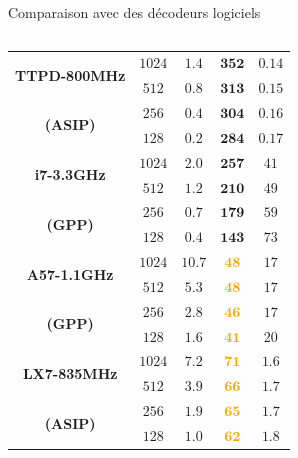 \documentclass[t,compress,mathserif,12pt,xcolor=dvipsnames]{beamer}
\newcommand{\ORANGE} [1]{\textcolor{orange}{\textbf{#1}}}
\newcommand{\GREEN} [1]{\textcolor{dgreen}{\textbf{#1}}}
\begin{document}
\begin{frame}[c]{Comparaison avec des décodeurs logiciels}
\begin{columns}[T]
\begin{column}{.48\textwidth}
{\begin{table}
{{\begin{tabular}{c|c|c|c|c}
				\multirow{2}{*}{\bf TTPD-800MHz}            & $1024$   & $1.4$  & \GREEN{$\mathbf{352}$} & $0.14$ \\ %
				                                            & $512$    & $0.8$  & \GREEN{$\mathbf{313}$} & $0.15$ \\ %
				\multirow{2}{*}{\bf (ASIP)}                 & $256$    & $0.4$  & \GREEN{$\mathbf{304}$} & $0.16$ \\ %
				                                            & $128$    & $0.2$  & \GREEN{$\mathbf{284}$} & $0.17$ \\ %
				\midrule
				\multirow{2}{*}{\bf i7-3.3GHz}              & $1024$   & $2.0$  & \GREEN{$\mathbf{257}$} & $41$   \\
				                                            & $512$    & $1.2$  & \GREEN{$\mathbf{210}$} & $49$   \\
				\multirow{2}{*}{\bf (GPP)}                  & $256$    & $0.7$  & \GREEN{$\mathbf{179}$} & $59$   \\
				                                            & $128$    & $0.4$  & \GREEN{$\mathbf{143}$} & $73$   \\
				\midrule    
				\multirow{2}{*}{\bf A57-1.1GHz}             & $1024$   & $10.7$ & \ORANGE{$\mathbf{48}$} & $17$   \\
				                                            & $512$    & $5.3$  & \ORANGE{$\mathbf{48}$} & $17$   \\
				\multirow{2}{*}{\bf (GPP)}                  & $256$    & $2.8$  & \ORANGE{$\mathbf{46}$} & $17$   \\
				                                            & $128$    & $1.6$  & \ORANGE{$\mathbf{41}$} & $20$   \\
				\midrule
				\multirow{2}{*}{\bf LX7-835MHz}             & $1024$   & $7.2$  & \ORANGE{$\mathbf{71}$} & $1.6$  \\
				                                            & $512$    & $3.9$  & \ORANGE{$\mathbf{66}$} & $1.7$  \\
				\multirow{2}{*}{\bf (ASIP)}                 & $256$    & $1.9$  & \ORANGE{$\mathbf{65}$} & $1.7$  \\
				                                            & $128$    & $1.0$  & \ORANGE{$\mathbf{62}$} & $1.8$  \\

				\bottomrule
			\end{tabular}
			}}
		\end{table}
		}
\end{column}
\end{columns}
\end{frame}
\end{document}
